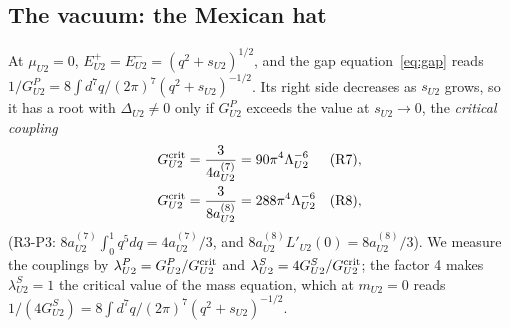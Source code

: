 \subsection{The vacuum: the Mexican hat}

At $\mu_{U2}=0$, $E^+_{U2}=E^-_{U2}=(q^2+s_{U2})^{1/2}$, and the gap equation~\eqref{eq:gap}
reads $1/G^P_{U2}=8\int d^7q/(2\pi)^7(q^2+s_{U2})^{-1/2}$. Its right side decreases as $s_{U2}$
grows, so it has a root with $\Delta_{U2}\neq0$ only if $G^P_{U2}$ exceeds the value at
$s_{U2}\to0$, the \emph{critical coupling}
\begin{equation}
\begin{aligned}
G^{\rm crit}_{U2}&=\frac{3}{4a^{(7)}_{U2}}=90\pi^4\Lambda_{U2}^{-6}&&\text{(R7)},\\
G^{\rm crit}_{U2}&=\frac{3}{8a^{(8)}_{U2}}=288\pi^4\Lambda_{U2}^{-6}&&\text{(R8)},
\end{aligned}
\label{eq:Gcrit}
\end{equation}
(R3-P3: $8a^{(7)}_{U2}\int_0^1q^5dq=4a^{(7)}_{U2}/3$, and $8a^{(8)}_{U2}L'_{U2}(0)=8a^{(8)}_{U2}/3$). We
measure the couplings by $\lambda^P_{U2}=G^P_{U2}/G^{\rm crit}_{U2}$ and $\lambda^S_{U2}=4G^S_{U2}/
G^{\rm crit}_{U2}$; the factor 4 makes $\lambda^S_{U2}=1$ the critical value of the mass equation,
which at $m_{U2}=0$ reads $1/(4G^S_{U2})=8\int d^7q/(2\pi)^7(q^2+s_{U2})^{-1/2}$.

